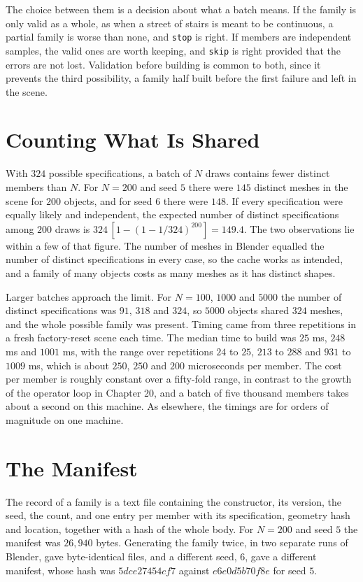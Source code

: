 The choice between them is a decision about what a batch means. If the family is only valid as a whole, as when a street of stairs is meant to be continuous, a partial family is worse than none, and \texttt{stop} is right. If members are independent samples, the valid ones are worth keeping, and \texttt{skip} is right provided that the errors are not lost. Validation before building is common to both, since it prevents the third possibility, a family half built before the first failure and left in the scene.

\section{Counting What Is Shared}

With $324$ possible specifications, a batch of $N$ draws contains fewer distinct members than $N$. For $N=200$ and seed $5$ there were $145$ distinct meshes in the scene for $200$ objects, and for seed $6$ there were $148$. If every specification were equally likely and independent, the expected number of distinct specifications among $200$ draws is $324\,[1-(1-1/324)^{200}]=149.4$. The two observations lie within a few of that figure. The number of meshes in Blender equalled the number of distinct specifications in every case, so the cache works as intended, and a family of many objects costs as many meshes as it has distinct shapes.

Larger batches approach the limit. For $N=100$, $1000$ and $5000$ the number of distinct specifications was $91$, $318$ and $324$, so $5000$ objects shared $324$ meshes, and the whole possible family was present. Timing came from three repetitions in a fresh factory-reset scene each time. The median time to build was $25$ ms, $248$ ms and $1001$ ms, with the range over repetitions $24$ to $25$, $213$ to $288$ and $931$ to $1009$ ms, which is about $250$, $250$ and $200$ microseconds per member. The cost per member is roughly constant over a fifty-fold range, in contrast to the growth of the operator loop in Chapter 20, and a batch of five thousand members takes about a second on this machine. As elsewhere, the timings are for orders of magnitude on one machine.

\section{The Manifest}

The record of a family is a text file containing the constructor, its version, the seed, the count, and one entry per member with its specification, geometry hash and location, together with a hash of the whole body. For $N=200$ and seed $5$ the manifest was $26{,}940$ bytes. Generating the family twice, in two separate runs of Blender, gave byte-identical files, and a different seed, $6$, gave a different manifest, whose hash was $5dce27454cf7$ against $e6e0d5b70f8e$ for seed $5$.


